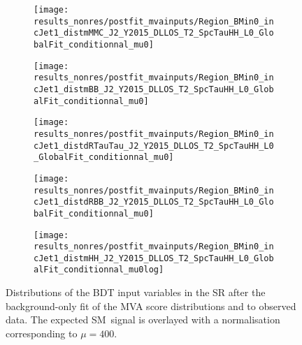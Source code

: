 \begin{figure}[htbp]
  \centering

  \begin{subfigure}{0.46\textwidth}
    \texttt{[image: results\_nonres/postfit\_mvainputs/Region\_BMin0\_incJet1\_distmMMC\_J2\_Y2015\_DLLOS\_T2\_SpcTauHH\_L0\_GlobalFit\_conditionnal\_mu0]}
  \end{subfigure}\hfill%
  \begin{subfigure}{0.46\textwidth}
    \texttt{[image: results\_nonres/postfit\_mvainputs/Region\_BMin0\_incJet1\_distmBB\_J2\_Y2015\_DLLOS\_T2\_SpcTauHH\_L0\_GlobalFit\_conditionnal\_mu0]}
  \end{subfigure}

  \begin{subfigure}{0.46\textwidth}
    \texttt{[image: results\_nonres/postfit\_mvainputs/Region\_BMin0\_incJet1\_distdRTauTau\_J2\_Y2015\_DLLOS\_T2\_SpcTauHH\_L0\_GlobalFit\_conditionnal\_mu0]}
  \end{subfigure}\hfill%
  \begin{subfigure}{0.46\textwidth}
    \texttt{[image: results\_nonres/postfit\_mvainputs/Region\_BMin0\_incJet1\_distdRBB\_J2\_Y2015\_DLLOS\_T2\_SpcTauHH\_L0\_GlobalFit\_conditionnal\_mu0]}
  \end{subfigure}

  \begin{subfigure}{0.46\textwidth}
    \texttt{[image: results\_nonres/postfit\_mvainputs/Region\_BMin0\_incJet1\_distmHH\_J2\_Y2015\_DLLOS\_T2\_SpcTauHH\_L0\_GlobalFit\_conditionnal\_mu0log]}
  \end{subfigure}

  \caption[Distributions of the BDT input variables in the \hadhad SR after the
  background-only fit.]{Distributions of the BDT input variables in the \hadhad
    SR after the background-only fit of the MVA score distributions and \mll to
    observed data. The expected SM~\HH signal is overlayed with a normalisation
    corresponding to $\mu = 400$.}%
  \label{fig:postfit_mva_inputs}
\end{figure}


